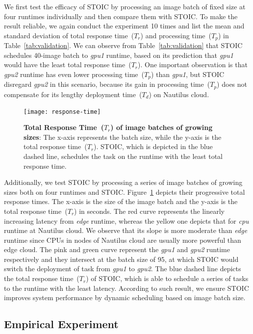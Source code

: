 We first test the efficacy of STOIC by processing an image batch of fixed size at four runtimes individually and then compare them with STOIC. To make the result reliable, we again conduct the experiment 10 times and list the mean and standard deviation of total response time~($T_r$) and processing time~($T_p$) in Table~\ref{tab:validation}. We can observe from Table~\ref{tab:validation} that STOIC schedules 40-image batch to \textit{gpu1} runtime, based on its prediction that  \textit{gpu1} would have the least total response time~($T_r$). One important observation is that \textit{gpu2} runtime has even lower processing time~($T_p$) than \textit{gpu1}, but STOIC disregard \textit{gpu2} in this scenario, because its gain in processing time~($T_p$) does not compensate for its lengthy deployment time~($T_d$) on Nautilus cloud.

\begin{figure}[t] \centering 
\texttt{[image: response-time]}
\caption{\textbf{Total Response Time~($T_r$) of image batches of growing sizes}: The x-axis represents the batch size, while the y-axis is the total response time~($T_r$). STOIC, which is depicted in the blue dashed line, schedules the task on the runtime with the least total response time.  
\label{fig:response-time}}
\end{figure}

Additionally, we test STOIC by processing a series of image batches of growing sizes both on four runtimes and STOIC. Figure~\ref{fig:response-time} depicts their progressive total response times. The x-axis is the size of the image batch and the y-axis is the total response time~($T_r$) in seconds. The red curve represents the linearly increasing latency from \textit{edge} runtime, whereas the yellow one depicts that for \textit{cpu} runtime at Nautilus cloud. We observe that its slope is more moderate than \textit{edge} runtime since CPUs in nodes of Nautilus cloud are usually more powerful than edge cloud. The pink and green curve represent the \textit{gpu1} and \textit{gpu2} runtime respectively and they intersect at the batch size of 95, at which STOIC would switch the deployment of task from \textit{gpu1} to \textit{gpu2}. The blue dashed line depicts the total response time~($T_r$) of STOIC, which is able to schedule a series of tasks to the runtime with the least latency. According to such result, we ensure STOIC improves system performance by dynamic scheduling based on image batch size.


\subsection{Empirical Experiment}


